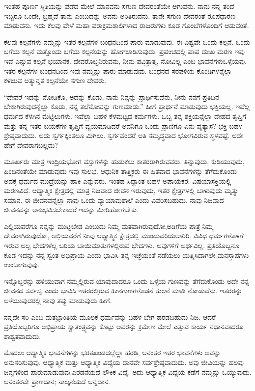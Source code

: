ಇಂತಹ ಪೂರ್ಣ ಸ್ಥಿತಿಯನ್ನು ಪಡೆದ ಮೇಲೆ ಮಾನವನು ಸಗುಣ ದೇವರಂತೆಯೇ ಆಗುವನು. ನಾನು ನನ್ನ ತಂದೆ ಇಬ್ಬರೂ ಒಂದೇ, ಬ್ರಹ್ಮವೆ ತಾನು ಎಂಬುದನ್ನು ಅವನು ಅರಿತಿರುವನು. ತಾನೇ ಸಗುಣ ದೇವರಂತೆ ರೂಪಧಾರಣ ಮಾಡುವನು. ಇದು ಕೆಲವು ವೇಳೆ ಮಹಾ ಪರಾಕ್ರಮಶಾಲಿಗಳಾದ ರಾಜರುಗಳು ಕೂಡ ಗೊಂಬೆಗಳೊಂದಿಗೆ ಆಡುವಂತೆ.

ಕೆಲವು ಕಲ್ಪನೆಗಳು ನಮ್ಮನ್ನು ಇತರ ಕಲ್ಪನೆಗಳ ಬಂಧನದಿಂದ ಪಾರು ಮಾಡುವುವು. ಈ ವಿಶ್ವವೇ ಒಂದು ಕಲ್ಪನೆ. ಒಂದು ಬಗೆಯ ಕಲ್ಪನೆ ಮತ್ತೊಂದು ಬಗೆಯ ಕಲ್ಪನೆಯನ್ನು ಹೋಗಲಾಡಿಸುವುದು. ಪ್ರಪಂಚದಲ್ಲಿ ಪಾಪ ದುಃಖ ಮರಣ ಇವು ಇವೆ ಎನ್ನುವ ಕಲ್ಪನೆ ಭಯಾನಕ. ದೇವರೊಬ್ಬನಿರುವನು, ನೀನು ಪವಿತ್ರಾತ್ಮ, ನೋವಿಲ್ಲ ಎಂಬ ಭಾವನೆಗಳು\break ಒಳ್ಳೆಯವು. ಇತರ ಕಲ್ಪನೆಗಳ ಬಂಧನದಿಂದ ಇವು ನಮ್ಮನ್ನು ಪಾರು ಮಾಡುವುವು. ಬಂಧನದ ಸರಪಳಿಯ ಕೊಂಡಿಗಳನ್ನೆಲ್ಲಾ ಕಳಚುವ ಅತ್ಯುನ್ನತ ಕಲ್ಪನೆಯೇ ಸಗುಣ ದೇವರು.

“ದೇವರೆ ಇದನ್ನು ನೋಡಿಕೊ, ಅದನ್ನು ಕೊಡು, ನಾನು ನಿನ್ನನ್ನು ಪ್ರಾರ್ಥಿಸುವೆನು, ನೀನು ನನಗೆ ಪ್ರತಿದಿನ ಬೇಕಾಗಿರುವುದನ್ನೆಲ್ಲಾ ಕೊಡು, ನನ್ನ ತಲೆನೋವನ್ನು ಗುಣಮಾಡು.” ಹೀಗೆ ಪ್ರಾರ್ಥನೆ ಮಾಡುವುದು ಭಕ್ತಿಯಲ್ಲ. ಇವೆಲ್ಲ ಧರ್ಮದ ಕೆಳಗಿನ ಮೆಟ್ಟಿಲುಗಳು. ಇವೆಲ್ಲಾ ಬಹಳ ಕೆಳಮಟ್ಟದ ಕರ್ಮಗಳು. ಒಬ್ಬ ತನ್ನ ಶಕ್ತಿಯನ್ನೆಲ್ಲಾ ದೇಹದ ತೃಪ್ತಿಗೆ ಮತ್ತು ತನ್ನ ಇತರ ಬಯಕೆಗಳ ತೃಪ್ತಿಗೆ ವ್ಯಯಮಾಡಿದರೆ ಅವನಿಗೂ ಒಂದು ಪ್ರಾಣಿಗೂ ಏನು ವ್ಯತ್ಯಾಸ? ಭಕ್ತಿ ಬಹಳ ಶ್ರೇಷ್ಠವಾದುದು. ಅದು ಸ್ವರ್ಗಕ್ಕಿಂತಲೂ ಮಿಗಿಲು. ಸ್ವರ್ಗವೆಂದರೆ ಅತಿ ಸಮೃದ್ಧವಾದ ಭೋಗವಿರುವ ಸ್ಥಳವಷ್ಟೆ. ಅದೇ ಹೇಗೆ ದೇವರಾಗಬಲ್ಲದು?

ಮೂರ್ಖರು ಮಾತ್ರ ಇಂದ್ರಿಯಭೋಗ ವಸ್ತುಗಳನ್ನು ಹುಡುಕಲು ಕಾತರರಾಗಿರು\-ವವರು. ತಿನ್ನುವುದು, ಕುಡಿಯುವುದು, ಹಿಂದಿನಂತೆಯೇ ಮಾಡುವುದು ಇವು ಸುಲಭ. ಆಧುನಿಕ ತಾತ್ತ್ವಿಕರು ಈ ಹಿತವಾದ ಭಾವನೆಗಳನ್ನು ತೆಗೆದುಕೊಂಡು ಅವಕ್ಕೆ ಧರ್ಮದ ಮುದ್ರೆಯನ್ನು ಹಾಕಿ ಎನ್ನುವರು. ಇಂತಹ ಸಿದ್ಧಾಂತ ಬಹಳ ಅಪಾಯಕರ. ವಿಷಯಾಸಕ್ತಿ\-ಯಲ್ಲಿ ಮರಣವಿದೆ. ಆಧ್ಯಾತ್ಮಿಕ ಕ್ಷೇತ್ರದಲ್ಲಿ ಮಾತ್ರ ನಿಜವಾದ ಜೀವನ ಇರುವುದು, ಇತರ ಕ್ಷೇತ್ರಗಳಲ್ಲಿ ಬಾಳುವುದು ಮೃತ್ಯು ಸಮಾನ. ಈ ಜೀವನವನ್ನೆಲ್ಲಾ ನಾವು ಒಂದು ವ್ಯಾಯಾಮಶಾಲೆ ಎಂದು ವಿವರಿಸಬಹುದು. ನಾವು ನಿಜವಾದ ಜೀವನವನ್ನು ಅನುಭವಿಸಬೇಕಾದರೆ ಇದನ್ನು ಮೀರಿಹೋಗಬೇಕು.

ಎಲ್ಲಿಯವರೆಗೂ ನನ್ನನ್ನು ಮುಟ್ಟಬೇಡ ಎಂಬುದು ನಿಮ್ಮ ಮತವಾಗಿರುವುದೋ,\break ಅಡಿಗೆಯ ಪಾತ್ರೆ ನಿಮ್ಮ ದೇವರಾಗಿರುವುದೋ, ಅಲ್ಲಿಯವರೆಗೆ ನೀವು ಆಧ್ಯಾತ್ಮಿಕ ಕ್ಷೇತ್ರದಲ್ಲಿ ಮುಂದುವರಿಯಲಾರಿರಿ. ವಿವಿಧ ಧರ್ಮಗಳೊಳಗೆ ಇರುವ ಅಲ್ಪ ಭೇದಗಳೆಲ್ಲ ಬರಿಯ ಬಾಯಿಮಾತುಗಳಲ್ಲಿರುವ ಭೇದಗಳು. ಅವುಗಳಿಗೆ ಅರ್ಥವಿಲ್ಲ. ಪ್ರತಿಯೊಬ್ಬನೂ ಕೂಡ ಇದನ್ನು ನನ್ನ ಸ್ವಂತ ಅಭಿಪ್ರಾಯ ಎಂದು ಭಾವಿಸಿ ತನ್ನ ಇಚ್ಛೆಯಂತೆ ನಡೆಯಲು ಯತ್ನಿಸಿದಾಗಲೇ ಮನಸ್ತಾಪಗಳು ಉಂಟಾಗುವುವು.

ಇನ್ನೊಬ್ಬರನ್ನು ಹಳಿಯುವಾಗ ನಮ್ಮಲ್ಲಿರುವ ಯಾವುದಾದರೂ ಒಂದು ಒಳ್ಳೆಯ ಗುಣವನ್ನು ತೆಗೆದುಕೊಂಡು ಅದೇ ನನ್ನ ಜೀವನದ ಸರ್ವಸ್ವ ಎಂದು ಭಾವಿಸಿ ಇತರರಲ್ಲಿರುವ ಹೀನಗುಣಗಳೊಡನೆ ತುಲನೆ ಮಾಡಿ ನೋಡುವೆನು. ಇತರರನ್ನು ಅಳೆಯುವುದರಲ್ಲಿ ನಾವು ತಪ್ಪು ಮಾಡುವುದು ಹೀಗೆ.

ನನ್ನದೇ ಸರಿ ಎಂಬ ಮತಭ್ರಾಂತಿಯ ಮೂಲಕ ಧರ್ಮವನ್ನು ಬಹಳ ಬೇಗ ಹರಡಬಹುದು ನಿಜ. ಆದರೆ ಪ್ರತಿಯೊಬ್ಬರಿಗೂ ಅಭಿಪ್ರಾಯ ಸ್ವಾತಂತ್ರ್ಯವನ್ನು ಕೊಟ್ಟು ಅವರನ್ನು ಕ್ರಮೇಣ ಮೇಲೆ ಎತ್ತುವ ಕಾರ್ಯ ನಿಧಾನವಾದರೂ ಶಾಶ್ವತವಾದುದು.

ಮೊದಲು ಆಧ್ಯಾತ್ಮಿಕ ಭಾವನೆಗಳನ್ನು ಭರತಖಂಡದಲ್ಲೆಲ್ಲಾ ಹರಡಿ, ಅನಂತರ ಇತರ ಭಾವನೆಗಳು ಅವನ್ನು ಅನುಸರಿಸುವುವು. ಆಧ್ಯಾತ್ಮಿಕ ಮತ್ತು ಆಧ್ಯಾತ್ಮಿಕ ವಿದ್ಯೆಯ ದಾನವೇ ಸರ್ವಶ್ರೇಷ್ಠವಾದುದು. ಅವು ಜೀವಿಯನ್ನು ಹಲವು ಜನ್ಮಗಳಿಂದ ಪಾರುಮಾಡುವುವು.\break ಎರಡನೆಯದೆ ಲೌಕಿಕ ವಿದ್ಯೆ. ಅದು ಆಧ್ಯಾತ್ಮಿಕ ವಿದ್ಯೆಯ ಕಡೆಗೆ ನಮ್ಮನ್ನು ಒಯ್ಯುವುದು. ಅನಂತರವೇ ಪ್ರಾಣದಾನ; ನಾಲ್ಕನೆಯದೆ ಅನ್ನದಾನ.

